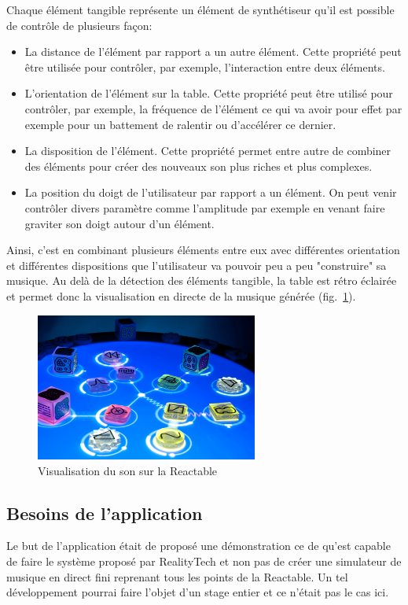 Chaque élément tangible représente un élément de synthétiseur qu'il est possible de contrôle de plusieurs façon:
\begin{itemize} 
\item La distance de l'élément par rapport a un autre élément. Cette propriété peut être utilisée pour contrôler, par exemple, l'interaction entre deux éléments.
\item L'orientation de l'élément sur la table. Cette propriété peut être utilisé pour contrôler, par exemple, la fréquence de l'élément ce qui va avoir pour effet par exemple pour un battement de ralentir ou d'accélérer ce dernier.
\item La disposition de l'élément. Cette propriété permet entre autre de combiner des éléments pour créer des nouveaux son plus riches et plus complexes.
\item La position du doigt de l'utilisateur par rapport a un élément. On peut venir contrôler divers paramètre comme l'amplitude par exemple en venant faire graviter son doigt autour d'un élément.
\end{itemize}
Ainsi, c'est en combinant plusieurs éléments entre eux avec différentes orientation et différentes dispositions que l'utilisateur va pouvoir peu a peu "construire" sa musique.
Au delà de la détection des éléments tangible, la table est rétro éclairée et permet donc la visualisation en directe de la musique générée (fig.~\ref{fig:reactivsu}).

\begin{figure}[H]
\centering
\includegraphics[width=0.65\textwidth]{images/reactvisu}
\caption{Visualisation du son sur la Reactable\protect\footnotemark}
\label{fig:reactivsu}
\end{figure}


\subsection{Besoins de l'application}
\label{subsec:reartable:content}
Le but de l'application était de proposé une démonstration ce de qu'est capable de faire le système proposé par RealityTech et non pas de créer une simulateur de musique en direct fini reprenant tous les points de la Reactable. Un tel développement pourrai faire l'objet d'un stage entier et ce n'était pas le cas ici.

